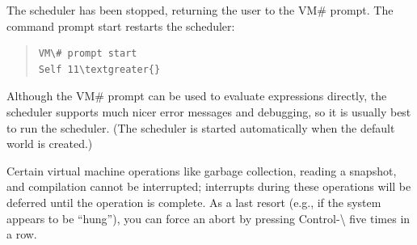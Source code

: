 \documentclass[letterpaper,10pt,english]{sphinxmanual}
\begin{document}
The scheduler has been stopped, returning the user to the VM\# prompt. The command prompt
start restarts the scheduler:
\begin{quote}

\begin{Verbatim}[commandchars=\\\{\}]
VM\# prompt start
Self 11\textgreater{}
\end{Verbatim}
\end{quote}

Although the VM\# prompt can be used to evaluate expressions directly, the scheduler supports
much nicer error messages and debugging, so it is usually best to run the scheduler. (The scheduler
is started automatically when the default world is created.)

Certain virtual machine operations like garbage collection, reading a snapshot, and compilation
cannot be interrupted; interrupts during these operations will be deferred until the operation is
complete. As a last resort (e.g., if the system appears to be “hung”), you can force an abort by
pressing Control-\textbackslash{} five times in a row.
\end{document}
